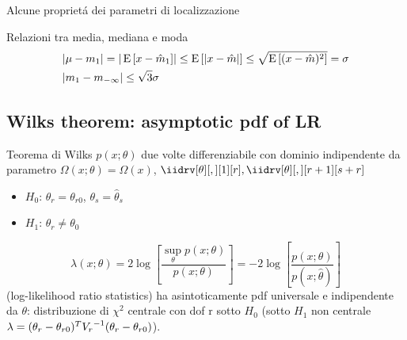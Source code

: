 \documentclass[asd-beamer.tex]{subfiles}
\begin{document}
\begin{wordonframe}{Alcune propriet\'a dei parametri di localizzazione}
\begin{block}{Relazioni tra media, mediana e moda}
\begin{align*}
&|\mu-m_1|=|\operatorname{E}{[x-\hat{m}_1]}|\leq\operatorname{E}{[|x-\hat{m}|]}\leq\sqrt{\operatorname{E}{[(x-\hat{m})^2]}}=\sigma\\
&|m_1-m_{-\infty}|\leq\sqrt{3}\sigma
\end{align*}
\end{block}
\end{wordonframe}

\subsection{Wilks theorem: asymptotic pdf of LR}

\begin{frame}{Teorema di Wilks}\frameintoc
$p(x;\theta)$ due volte differenziabile con dominio indipendente da parametro $\Omega(x;\theta)=\Omega(x)$, $\iidrv[\theta][,][1][r],\iidrv[\theta][,][r+1][s+r]$
\begin{itemize}
\item $H_0$: $\theta_r=\theta_{r0}$, $\theta_s=\hat{\theta}_s$
\item $H_1$: $\theta_r\neq\theta_0$
\end{itemize}
 \[\lambda(x;\theta)=2\log{[\frac{\sup_{\theta}{p(x;\theta)}}{p(x;\theta)}]}=-2\log{[\frac{p(x;\theta)}{p(x;\hat{\theta})}]}\] (log-likelihood ratio statistics) ha asintoticamente pdf universale e indipendente da $\theta$: distribuzione di $\chi^2$ centrale con dof r sotto $H_0$ (sotto $H_1$ non centrale $\lambda=(\theta_r-\theta_{r0})^T{V_r}^{-1}(\theta_r-\theta_{r0})$).
\end{frame}
\end{document}
